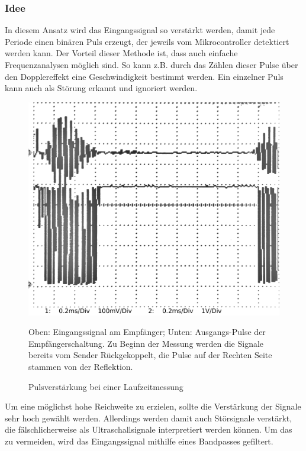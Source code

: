 \subsubsection{Idee}
In diesem Ansatz wird das Eingangssignal so verstärkt werden, damit jede Periode einen binären Puls erzeugt, der jeweils vom Mikrocontroller detektiert werden kann. Der Vorteil dieser Methode ist, dass auch einfache Frequenzanalysen möglich sind. So kann z.B. durch das Zählen dieser Pulse über den Dopplereffekt eine Geschwindigkeit bestimmt werden. Ein einzelner Puls kann auch als Störung erkannt und ignoriert werden.\\
\begin{figure}[H]
\centering
\includegraphics[width=(\textwidth), angle=0]{oszi/15-04-23/4_03.png}
\caption{Pulsverstärkung bei einer Laufzeitmessung} \label{img:I11}
Oben: Eingangssignal am Empfänger; Unten: Ausgangs-Pulse der Empfängerschaltung. Zu Beginn der Messung werden die Signale bereits vom Sender Rückgekoppelt, die Pulse auf der Rechten Seite stammen von der Reflektion.
\end{figure}
Um eine möglichst hohe Reichweite zu erzielen, sollte die Verstärkung der Signale sehr hoch gewählt werden. Allerdings werden damit auch Störsignale verstärkt, die fälschlicherweise als Ultraschallsignale interpretiert werden können. Um das zu vermeiden, wird das Eingangssignal mithilfe eines Bandpasses gefiltert.



